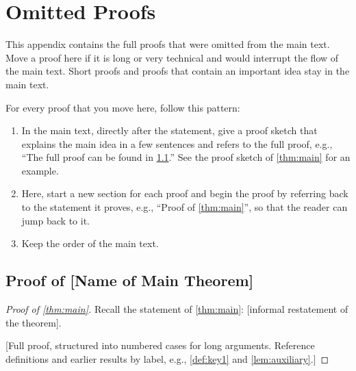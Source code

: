\chapter{Omitted Proofs}\label{app:omitted-proofs}

This appendix contains the full proofs that were omitted from the main text.
Move a proof here if it is long or very technical and would interrupt the
flow of the main text.
Short proofs and proofs that contain an important idea stay in the main text.

For every proof that you move here, follow this pattern:
\begin{enumerate}
    \item In the main text, directly after the statement, give a proof sketch
          that explains the main idea in a few sentences and refers to the
          full proof, e.g., ``The full proof can be found in
          \cref{app:proof-main}.''
          See the proof sketch of \cref{thm:main} for an example.
    \item Here, start a new section for each proof and begin the proof by
          referring back to the statement it proves, e.g., ``Proof of
          \cref{thm:main}'', so that the reader can jump back to it.
    \item Keep the order of the main text.
\end{enumerate}

\section{Proof of [Name of Main Theorem]}\label{app:proof-main}

\begin{proof}[Proof of \cref{thm:main}]
    Recall the statement of \cref{thm:main}: [informal restatement of the
    theorem].

    [Full proof, structured into numbered cases for long arguments.
    Reference definitions and earlier results by label, e.g.,
    \cref{def:key1} and \cref{lem:auxiliary}.]
\end{proof}
